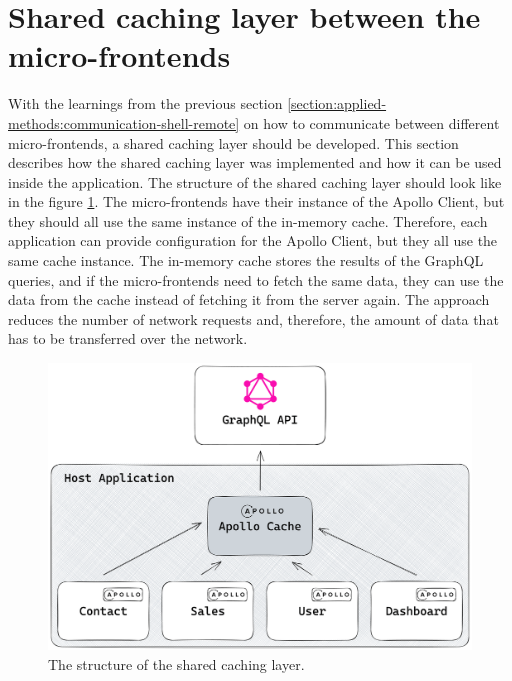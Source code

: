 \section{Shared caching layer between the micro-frontends}\label{section:applied-methods:shared-caching-layer}



\noindent With the learnings from the previous section \ref{section:applied-methods:communication-shell-remote} on how to communicate between different micro-frontends, a shared caching layer should be developed. This section describes how the shared caching layer was implemented and how it can be used inside the application. The structure of the shared caching layer should look like in the figure \ref{fig:applied-methods:structure-shared-caching-layer}. The micro-frontends have their instance of the Apollo Client, but they should all use the same instance of the in-memory cache. Therefore, each application can provide configuration for the Apollo Client, but they all use the same cache instance. The in-memory cache stores the results of the GraphQL queries, and if the micro-frontends need to fetch the same data, they can use the data from the cache instead of fetching it from the server again. The approach reduces the number of network requests and, therefore, the amount of data that has to be transferred over the network. 

\ifshowImages
  \begin{figure}[H]
  \centering
  \includegraphics[width=0.8\linewidth]{images/applied-methods/shared-caching-layer/shared-caching-layer.png}
  \caption{The structure of the shared caching layer.}\label{fig:applied-methods:structure-shared-caching-layer}
  \end{figure}
\fi

